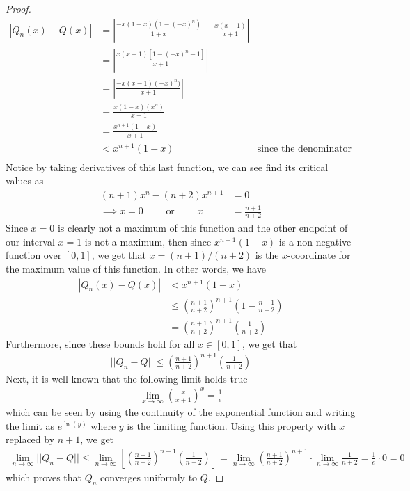 \documentclass[10pt,a4paper]{article}
\theoremstyle{definition}
\theoremstyle{definition}
\numberwithin{equation}{section}
\begin{document}
\begin{proof}
\begin{align*}
\left|Q_n(x) - Q(x)\right| &= \left|\frac{-x(1 - x)(1 - (-x)^n)}{1 + x} - \frac{x(x - 1)}{x + 1}\right|\\
&= \left|\frac{x(x - 1)[1 - (-x)^n - 1]}{x + 1}\right|\\
&= \left|\frac{-x(x - 1)(-x)^n)}{x + 1}\right|\\
&= \frac{x(1 - x)(x^n)}{x + 1}\\
&= \frac{x^{n + 1}(1 - x)}{x + 1}\\
&< x^{n+1}(1 - x) &\text{since the denominator was greater or equal than 1}\\
\end{align*}
Notice by taking derivatives of this last function, we can see find its critical values as
\begin{align*}
(n + 1)x^n - (n + 2)x^{n + 1} &= 0\\
\implies x = 0 \qquad \text{ or } \qquad x &= \frac{n + 1}{n + 2}
\end{align*}
Since $x = 0$ is clearly not a maximum of this function and the other endpoint of our interval $x = 1$ is not a maximum, then since $x^{n +1}(1 - x)$ is a non-negative function over $[0, 1]$, we get that $x = (n + 1)/(n + 2)$ is the $x$-coordinate for the maximum value of this function. In other words, we have
\begin{align*}
|Q_n(x) - Q(x)| &< x^{n+1}(1 - x)\\
&\leq \left(\frac{n + 1}{n + 2}\right)^{n + 1} \left(1 - \frac{n + 1}{n + 2}\right)\\
&= \left(\frac{n + 1}{n + 2}\right)^{n + 1} \left(\frac{1}{n + 2}\right)
\end{align*}
Furthermore, since these bounds hold for all $x \in [0, 1]$, we get that
\begin{align*}
||Q_n - Q|| \leq \left(\frac{n + 1}{n + 2}\right)^{n + 1} \left(\frac{1}{n + 2}\right)
\end{align*}
Next, it is well known that the following limit holds true
\begin{align*}
\lim_{x \to \infty} \left(\frac{x}{x + 1} \right)^x = \frac{1}{e}
\end{align*}
which can be seen by using the continuity of the exponential function and writing the limit as $e^{\ln(y)}$ where $y$ is the limiting function. Using this property with $x$ replaced by $n + 1$, we get
\begin{align*}
\lim_{n \to \infty} ||Q_n - Q|| \leq \lim_{n \to \infty} \left[\left(\frac{n + 1}{n + 2}\right)^{n + 1} \left(\frac{1}{n + 2}\right)\right] = \lim_{n \to \infty} \left(\frac{n + 1}{n + 2}\right)^{n + 1} \cdot \lim_{n \to \infty} \frac{1}{n + 2} = \frac{1}{e} \cdot 0 = 0
\end{align*}
which proves that $Q_n$ converges uniformly to $Q$. 
\end{proof}
\end{document}
